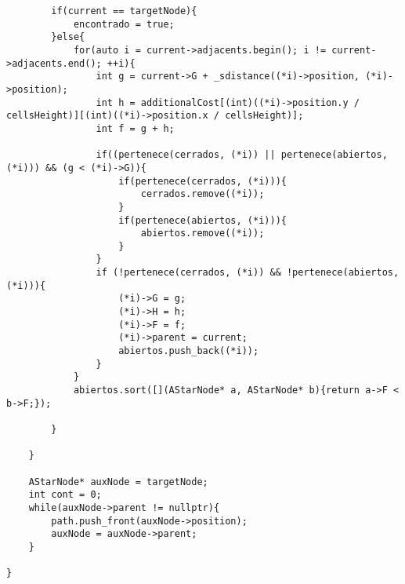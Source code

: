 \begin{lstlisting}
        if(current == targetNode){
            encontrado = true;
        }else{
            for(auto i = current->adjacents.begin(); i != current->adjacents.end(); ++i){
                int g = current->G + _sdistance((*i)->position, (*i)->position);
                int h = additionalCost[(int)((*i)->position.y / cellsHeight)][(int)((*i)->position.x / cellsHeight)];
                int f = g + h;

                if((pertenece(cerrados, (*i)) || pertenece(abiertos, (*i))) && (g < (*i)->G)){
                    if(pertenece(cerrados, (*i))){
                        cerrados.remove((*i));
                    }
                    if(pertenece(abiertos, (*i))){
                        abiertos.remove((*i));
                    }
                }
                if (!pertenece(cerrados, (*i)) && !pertenece(abiertos, (*i))){
                    (*i)->G = g;
                    (*i)->H = h;
                    (*i)->F = f;
                    (*i)->parent = current;
                    abiertos.push_back((*i));
                }
            }
            abiertos.sort([](AStarNode* a, AStarNode* b){return a->F < b->F;});
        
        }

    }

    AStarNode* auxNode = targetNode;
    int cont = 0;
    while(auxNode->parent != nullptr){
        path.push_front(auxNode->position);
        auxNode = auxNode->parent;
    }

}

\end{lstlisting}